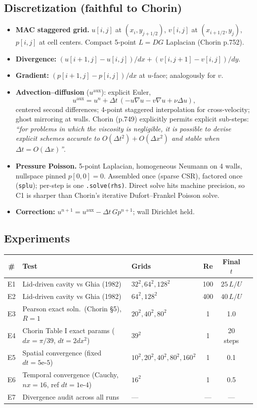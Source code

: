 \documentclass[11pt]{article}
\begin{document}
\subsection{Discretization (faithful to Chorin)}

\begin{itemize}
    \item \textbf{MAC staggered grid.} $u[i,j]$ at $(x_i, y_{j+1/2})$, $v[i,j]$ at $(x_{i+1/2}, y_j)$, $p[i,j]$ at cell centers. Compact 5-point $L = DG$ Laplacian (Chorin p.752).
    \item \textbf{Divergence:} $(u[i{+}1,j] - u[i,j])/dx + (v[i,j{+}1] - v[i,j])/dy$.
    \item \textbf{Gradient:} $(p[i{+}1,j]-p[i,j])/dx$ at $u$-face; analogously for $v$.
    \item \textbf{Advection--diffusion} ($u^{\mathrm{aux}}$): explicit Euler,
    \[
        u^{\mathrm{aux}} = u^n + \Delta t\,(-u\nabla u - v \nabla u + \nu \Delta u),
    \]
    centered second differences; 4-point staggered interpolation for cross-velocity; ghost mirroring at walls. Chorin (p.749) explicitly permits explicit sub-steps: \emph{``for problems in which the viscosity is negligible, it is possible to devise explicit schemes accurate to $O(\Delta t^2) + O(\Delta x^2)$ and stable when $\Delta t = O(\Delta x)$''}.
    \item \textbf{Pressure Poisson.} 5-point Laplacian, homogeneous Neumann on 4 walls, nullspace pinned $p[0,0]=0$. Assembled once (sparse CSR), factored once (\texttt{splu}); per-step is one \texttt{.solve(rhs)}. Direct solve hits machine precision, so C1 is sharper than Chorin's iterative Dufort--Frankel Poisson solve.
    \item \textbf{Correction:} $u^{n+1} = u^{\mathrm{aux}} - \Delta t\, G p^{n+1}$; wall Dirichlet held.
\end{itemize}

\subsection{Experiments}

\begin{longtable}{@{}cllccc@{}}
\toprule
\# & Test & Grids & Re & Final $t$ \\
\midrule
E1 & Lid-driven cavity vs Ghia (1982) & $32^2, 64^2, 128^2$ & 100 & $25\,L/U$ \\
E2 & Lid-driven cavity vs Ghia (1982) & $64^2, 128^2$ & 400 & $40\,L/U$ \\
E3 & Pearson exact soln.\ (Chorin \S 5), $R=1$ & $20^2, 40^2, 80^2$ & 1 & 1.0 \\
E4 & Chorin Table I exact params ($dx=\pi/39$, $dt=2dx^2$) & $39^2$ & 1 & 20 steps \\
E5 & Spatial convergence (fixed $dt=5\text{e-}5$) & $10^2, 20^2, 40^2, 80^2, 160^2$ & 1 & 0.1 \\
E6 & Temporal convergence (Cauchy, $nx=16$, ref $dt=1\text{e-}4$) & $16^2$ & 1 & 0.5 \\
E7 & Divergence audit across all runs & --- & --- & --- \\
\bottomrule
\end{longtable}
\end{document}
